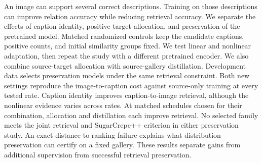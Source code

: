 An image can support several correct descriptions.
Training on those descriptions can improve relation accuracy while reducing retrieval accuracy.
We separate the effects of caption identity, positive-target allocation, and preservation of the pretrained model.
Matched randomized controls keep the candidate captions, positive counts, and initial similarity groups fixed.
We test linear and nonlinear adaptation, then repeat the study with a different pretrained encoder.
We also combine source-target allocation with source-gallery distillation.
Development data selects preservation models under the same retrieval constraint.
Both new settings reproduce the image-to-caption cost against source-only training at every tested rate.
Caption identity improves caption-to-image retrieval, although the nonlinear evidence varies across rates.
At matched schedules chosen for their combination, allocation and distillation each improve retrieval.
No selected family meets the joint retrieval and SugarCrepe++ criterion in either preservation study.
An exact distance to ranking failure explains what distribution preservation can certify on a fixed gallery.
These results separate gains from additional supervision from successful retrieval preservation.
